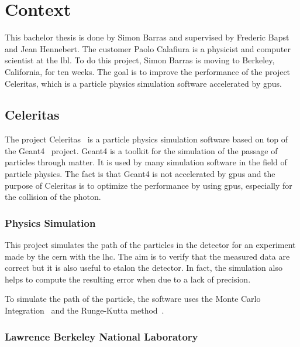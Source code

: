 \chapter{Context}
\label{spec:ch:context}

This bachelor thesis is done by Simon Barras and supervised by Frederic Bapst and Jean Hennebert.
The customer Paolo Calafiura is a physicist and computer scientist at the \acrfull{lbl}.
To do this project, Simon Barras is moving to Berkeley, California, for ten weeks.
The goal is to improve the performance of the project Celeritas, which is a particle physics simulation software accelerated by \acrshort{gpu}s.




\section{Celeritas}
\label{spec:ch:context:celeritas}

The project Celeritas~\cite{Celeritas-Project} is a particle physics simulation software based on top of the Geant4~\cite{Geant4} project.
Geant4 is a toolkit for the simulation of the passage of particles through matter.
It is used by many simulation software in the field of particle physics.
The fact is that Geant4 is not accelerated by \acrshort{gpu}s and the purpose of Celeritas is to optimize the performance by using \acrshort{gpu}s, especially for the collision of the photon.



\subsection{Physics Simulation}
\label{spec:ch:context:celeritas:physics-simulation}

This project simulates the path of the particles in the detector for an experiment made by the \acrfull{cern} with the \acrfull{lhc}.
The aim is to verify that the measured data are correct but it is also useful to etalon the detector.
In fact, the simulation also helps to compute the resulting error when due to a lack of precision.

To simulate the path of the particle, the software uses the Monte Carlo Integration~\cite{Monte-Carlo-integration} and the Runge-Kutta method~\cite{Runge-Kutta-methods}.


\subsection{Lawrence Berkeley National Laboratory}
\label{spec:ch:context:celeritas:lbl}

